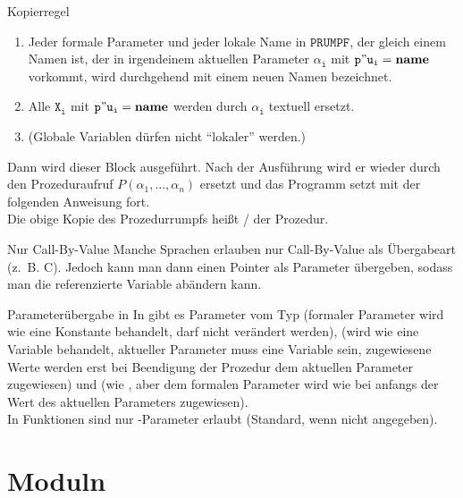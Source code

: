 \begin{Def}{Kopierregel}
\begin{enumerate}
        \item Jeder formale Parameter und jeder lokale Name in
        $\mathtt{PRUMPF}$, der gleich einem Namen ist, der in irgendeinem
        aktuellen Parameter $\mathtt{\alpha_i}$ mit
        $\mathtt{p"u_i = \mathbf{name}}$ vorkommt, wird durchgehend mit einem
        neuen Namen bezeichnet.

        \item Alle $\mathtt{X_i}$ mit $\mathtt{p"u_i = \mathbf{name}}$ werden
        durch $\mathtt{\alpha_i}$ textuell ersetzt.

        \item (Globale Variablen dürfen nicht "`lokaler"' werden.)
    \end{enumerate}

    Dann wird dieser Block ausgeführt.
    Nach der Ausführung wird er wieder durch den Prozeduraufruf
    $P(\alpha_1, \ldots, \alpha_n)$ ersetzt und das Programm setzt
    mit der folgenden Anweisung fort. \\
    Die obige Kopie des Prozedurrumpfs heißt
    / der Prozedur.
\end{Def}

\begin{Def}{Nur Call-By-Value}
    Manche Sprachen erlauben nur Call-By-Value als Übergabeart (z.~B. C).
    Jedoch kann man dann einen Pointer als Parameter übergeben, sodass
    man die referenzierte Variable abändern kann.
\end{Def}

\begin{Def}{Parameterübergabe in \Ada{}}
    In \Ada{} gibt es Parameter vom Typ  (formaler Parameter wird
    wie eine Konstante behandelt, darf nicht verändert werden), 
    (wird wie eine Variable behandelt, aktueller Parameter muss eine Variable
    sein, zugewiesene Werte werden erst bei Beendigung der Prozedur dem
    aktuellen Parameter zugewiesen) und 
    (wie , aber dem formalen Parameter
    wird wie bei  anfangs der Wert des aktuellen Parameters
    zugewiesen). \\
    In Funktionen sind nur -Parameter erlaubt
    (Standard, wenn nicht angegeben).
\end{Def}

\section{%
    Moduln%
}

